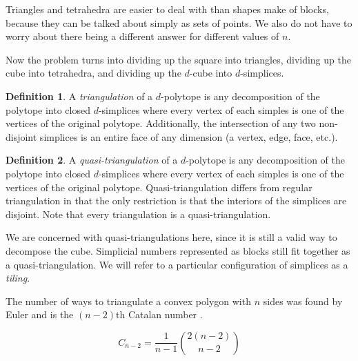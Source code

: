 \documentclass[12pt]{scrippsthesis}
\theoremstyle{definition}
\newtheorem{dfn}{Definition}[section]
\theoremstyle{remark}
\theoremstyle{plain}
\begin{document}
Triangles and tetrahedra are easier to deal with than shapes make of blocks, because they can be talked about simply as sets of points.  We also do not have to worry about there being a different answer for different values of $n$.



Now the problem turns into dividing up the square into triangles, dividing up the cube into tetrahedra, and dividing up the $d$-cube into $d$-simplices.  

\begin{dfn}
A \emph{triangulation} of a $d$-polytope is any decomposition of the polytope into closed $d$-simplices where every vertex of each simples is one of the vertices of the original polytope.  Additionally, the intersection of any two non-disjoint simplices is an entire face of any dimension (a vertex, edge, face, etc.).
\end{dfn}

\begin{dfn}
A \emph{quasi-triangulation} of a $d$-polytope is any decomposition of the polytope into closed $d$-simplices where every vertex of each simples is one of the vertices of the original polytope.  Quasi-triangulation differs from regular triangulation in that the only restriction is that the interiors of the simplices are disjoint.  Note that every triangulation is a quasi-triangulation.
\end{dfn}


We are concerned with quasi-triangulations here, since it is still a valid way to decompose the cube.  Simplicial numbers represented as blocks still fit together as a quasi-triangulation.  We will refer to a particular configuration of simplices as a \emph{tiling}.



  The number of ways to triangulate a convex polygon with $n$ sides was found by Euler and is the $(n-2)$th Catalan number \cite{Pickover}.

\begin{equation}
C_{n-2}=\frac{1}{n-1} {2(n-2) \choose  n-2}
\end{equation}
\end{document}
